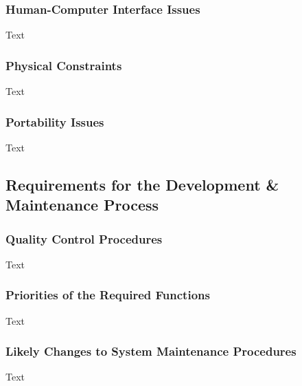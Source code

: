 \documentclass[12pt]{article}
\begin{document}
\subsubsection {Human-Computer Interface Issues}

Text

\subsubsection {Physical Constraints}

Text

\subsubsection {Portability Issues}

Text

\subsection{Requirements for the Development \& Maintenance Process}

\subsubsection {Quality Control Procedures}

Text

\subsubsection {Priorities of the Required Functions}

Text

\subsubsection {Likely Changes to System Maintenance Procedures}

Text
\end{document}
